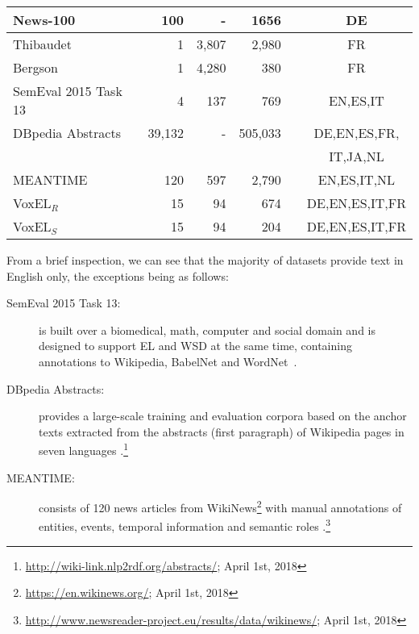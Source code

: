 \documentclass{llncs}
\newcommand{\cmark}{\ding{51}}%
\newcommand{\xmark}{\ding{55}}%
\begin{document}
\begin{table}[tb!]
\begin{tabular}{lrrrcc}
News-100~\cite{n3}                  &100     &-      &1656    &\cmark  &DE \\\midrule
Thibaudet~\cite{renden2016}         &1       &3,807  &2,980   &\xmark  &FR \\\midrule
Bergson~\cite{renden2016}           &1       &4,280  &380     &\xmark  &FR \\\midrule
SemEval 2015 
Task 13~\cite{moro2015semeval}      &4       &137    &769     &\cmark &EN,ES,IT \\ \midrule
DBpedia Abstracts
~\cite{abstracts2016}               &39,132  &-      &505,033 &\xmark &DE,EN,ES,FR, \\
                                    &        &       &        &       &IT,JA,NL \\\midrule
MEANTIME \cite{meantime2016}        &120     &597    &2,790   &\xmark &EN,ES,IT,NL \\\midrule 
VoxEL$_R$                           &15      &94     &674     &\cmark &DE,EN,ES,IT,FR\\\midrule  
VoxEL$_S$                           &15      &94     &204     &\cmark &DE,EN,ES,IT,FR\\ 
\bottomrule
\end{tabular}
\end{table}

From a brief inspection, we can see that the majority of datasets provide text in English only, the exceptions being as follows: 

\begin{description}
\item[SemEval 2015 Task 13:] is built over a biomedical, math, computer and social domain and is designed to support EL and WSD at the same time, containing annotations to Wikipedia, BabelNet and WordNet~\cite{moro2015semeval}.
\item[DBpedia Abstracts:] provides a large-scale training and evaluation corpora based on the anchor texts extracted from the abstracts (first paragraph) of Wikipedia pages in seven languages \cite{abstracts2016}.\footnote{\url{http://wiki-link.nlp2rdf.org/abstracts/}; April 1st, 2018} 
\item[MEANTIME:] consists of 120 news articles from WikiNews\footnote{\url{https://en.wikinews.org/}; April 1st, 2018} with manual annotations of entities, events, temporal information and semantic roles \cite{meantime2016}.\footnote{\url{http://www.newsreader-project.eu/results/data/wikinews/}; April 1st, 2018} 
\end{description}
\end{document}
